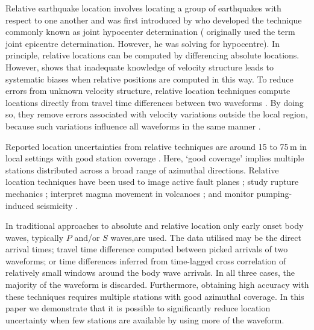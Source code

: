 \documentclass[12pt,double]{article}
\begin{document}
Relative earthquake location involves locating a group of
earthquakes with respect to one another and was first introduced by
\citet{dr_Douglas67a} who developed the technique commonly known as
joint hypocenter determination (\citet{dr_Douglas67a}
originally used the term joint epicentre determination. However, he
was solving for hypocentre). In principle, relative locations can be
computed by differencing absolute locations. However,
\citet{dr_Pavlis92a} shows that inadequate knowledge of velocity
structure leads to systematic biases when relative positions are
computed in this way. To reduce errors from unknown velocity
structure, relative location techniques compute locations directly
from travel time differences between two waveforms
\citep{dr_Ito85a, dr_Got94a, dr_Nadeau97a, dr_Waldhauser99a}. By doing
so, they remove errors associated with velocity variations outside
the local region, because such variations influence all waveforms in
the same manner \citep{dr_Shearer99a}.

Reported location uncertainties from relative techniques are  around
15 to 75\,m in local settings with good station coverage
\citep{dr_Ito85a, dr_Got94a, dr_Waldhauser99a,dr_Waldhauser08a}.
Here, `good coverage' implies multiple stations distributed across a
broad range of azimuthal directions. Relative location techniques
have been used to image active fault planes \citep{dr_Deichmann92a,
dr_Got94a, dr_Waldhauser99a, dr_Waldhauser02a, dr_Shearer05a}; study
rupture mechanics \citep{dr_Rubin99a, dr_Rubin02a}; interpret magma
movement in volcanoes \citep{dr_Fremont87a}; and monitor
pumping-induced seismicity \citep{dr_Lees98a, dr_Ake05a}.

In traditional approaches to absolute and relative location only
early onset body waves, typically $P$ and/or $S$ waves,are used. The
data utilised may be the direct arrival times; travel time
difference computed between picked arrivals of two waveforms; or
time differences inferred from time-lagged cross correlation of
relatively small windows around the body wave arrivals.
 In all three cases, the majority of the
waveform is discarded. Furthermore, obtaining high accuracy with these techniques
requires multiple stations with good azimuthal coverage.
In this paper we demonstrate that it is possible to
significantly reduce location uncertainty when few stations are
available by using more of the waveform.
\end{document}
